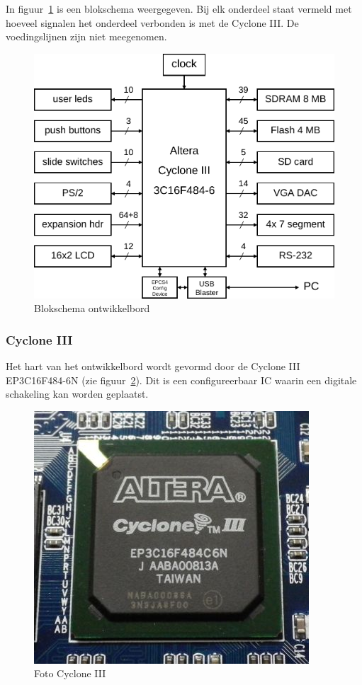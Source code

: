 \documentclass[a4paper,12pt,fleqn,twoside]{book}
\begin{document}
In figuur~\ref{fig:010blockdiagram} is een blokschema weergegeven. Bij elk
onderdeel staat vermeld met hoeveel signalen het onderdeel verbonden is met de
Cyclone III. De voedingslijnen zijn niet meegenomen. 

\begin{figure}[H]
\centering
\includegraphics[scale=0.50]{010blockdiagram.pdf}
\caption{Blokschema ontwikkelbord}
\label{fig:010blockdiagram}
\end{figure}

\subsubsection{Cyclone III}
Het hart van het ontwikkelbord wordt gevormd door de Cyclone III EP3C16F484-6N
(zie figuur~\ref{fig:ep3c16f484c6n}). Dit is een configureerbaar IC waarin een
digitale schakeling kan worden geplaatst.

\begin{figure}[H]
\centering
\includegraphics[scale=0.40]{ep3c16f484c6n.jpg}
\caption{Foto Cyclone III}
\label{fig:ep3c16f484c6n}
\end{figure}
\end{document}
